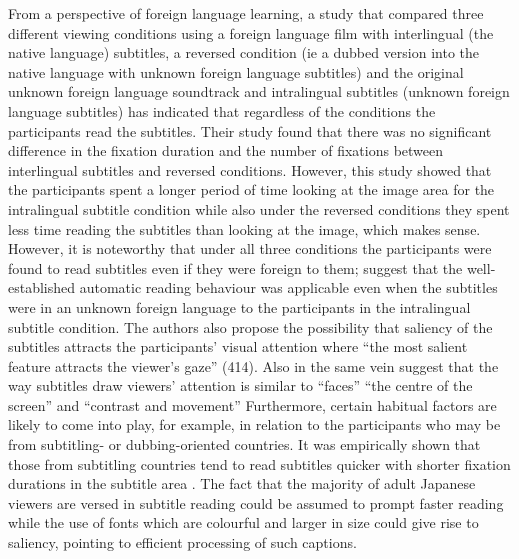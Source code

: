 \documentclass[output=paper]{langsci/langscibook}
\begin{document}
From a perspective of foreign language learning, a study \citep{bisson2014} that compared three different viewing conditions using a foreign language film with interlingual (the native language) subtitles, a reversed condition (ie a dubbed version into the native language with unknown foreign language subtitles) and the original unknown foreign language soundtrack and intralingual subtitles (unknown foreign language subtitles) has indicated that regardless of the conditions the participants read the subtitles. Their study found that there was no significant difference in the fixation duration and the number of fixations between interlingual subtitles and reversed conditions. However, this study showed that the participants spent a longer period of time looking at the image area for the intralingual subtitle condition while also under the reversed conditions they spent less time reading the subtitles than looking at the image, which makes sense. However, it is noteworthy that under all three conditions the participants were found to read subtitles even if they were foreign to them; \citet[414]{bisson2014} suggest that the well-established automatic reading behaviour was applicable even when the subtitles were in an unknown foreign language to the participants in the intralingual subtitle condition. The authors also propose the possibility that saliency of the subtitles attracts the participants' visual attention where ``the most salient feature attracts the viewer's gaze'' (414).  Also in the same vein \citet[n.p.]{Kruger2015} suggest that the way subtitles draw viewers' attention is similar to ``faces'' ``the centre of the screen'' and ``contrast and movement''  Furthermore, certain habitual factors are likely to come into play, for example, in relation to the participants who may be from subtitling- or dubbing-oriented countries. It was empirically shown that those from subtitling countries tend to read subtitles quicker with shorter fixation durations in the subtitle area \citep{Bruycker2007}.  The fact that the majority of adult Japanese viewers are versed in subtitle reading could be assumed to prompt faster reading while the use of fonts which are colourful and larger in size could give rise to saliency, pointing to efficient processing of such captions.   
\end{document}
